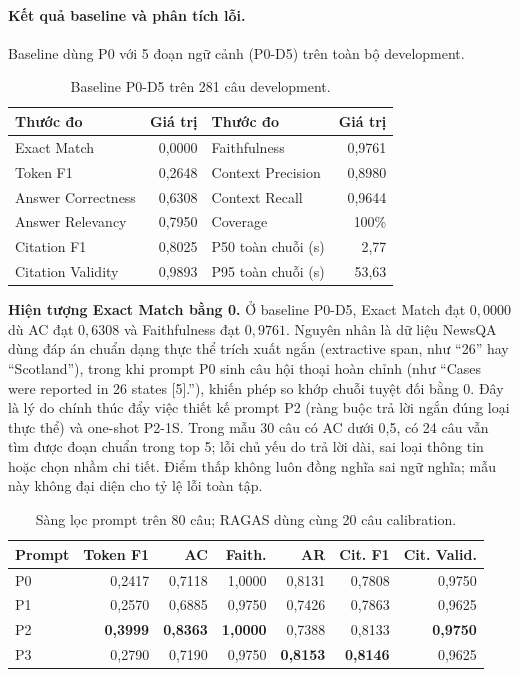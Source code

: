 \paragraph{Kết quả baseline và phân tích lỗi.}
Baseline dùng P0 với 5 đoạn ngữ cảnh (P0-D5) trên toàn bộ development.
\begin{table}[H]\centering\small
\caption{Baseline P0-D5 trên 281 câu development.}\label{tab:phase2-baseline}
\begin{tabularx}{\linewidth}{@{}YrYr@{}}\toprule
\textbf{Thước đo} & \textbf{Giá trị} & \textbf{Thước đo} & \textbf{Giá trị}\\\midrule
Exact Match & 0,0000 & Faithfulness & 0,9761 \\
Token F1 & 0,2648 & Context Precision & 0,8980 \\
Answer Correctness & 0,6308 & Context Recall & 0,9644 \\
Answer Relevancy & 0,7950 & Coverage & 100\% \\
Citation F1 & 0,8025 & P50 toàn chuỗi (s) & 2,77 \\
Citation Validity & 0,9893 & P95 toàn chuỗi (s) & 53,63 \\\bottomrule
\end{tabularx}\end{table}
\textbf{Hiện tượng Exact Match bằng 0.} Ở baseline P0-D5, Exact Match đạt $0{,}0000$ dù AC đạt $0{,}6308$ và Faithfulness đạt $0{,}9761$. Nguyên nhân là dữ liệu NewsQA dùng đáp án chuẩn dạng thực thể trích xuất ngắn (extractive span, như ``26'' hay ``Scotland''), trong khi prompt P0 sinh câu hội thoại hoàn chỉnh (như ``Cases were reported in 26 states [5].''), khiến phép so khớp chuỗi tuyệt đối bằng 0. Đây là lý do chính thúc đẩy việc thiết kế prompt P2 (ràng buộc trả lời ngắn đúng loại thực thể) và one-shot P2-1S. Trong mẫu 30 câu có AC dưới 0,5, có 24 câu vẫn tìm được đoạn chuẩn trong top 5; lỗi chủ yếu do trả lời dài, sai loại thông tin hoặc chọn nhầm chi tiết. Điểm thấp không luôn đồng nghĩa sai ngữ nghĩa; mẫu này không đại diện cho tỷ lệ lỗi toàn tập.
\begin{table}[H]
  \centering
  \caption{Sàng lọc prompt trên 80 câu; RAGAS dùng cùng 20 câu calibration.}
  \label{tab:phase2-prompt-screening}
  \small
  \begin{tabular}{lrrrrrr}
    \toprule
    \textbf{Prompt} & \textbf{Token F1} & \textbf{AC} & \textbf{Faith.} &
    \textbf{AR} & \textbf{Cit. F1} & \textbf{Cit. Valid.} \\
    \midrule
    P0 & 0,2417 & 0,7118 & 1,0000 & 0,8131 & 0,7808 & 0,9750 \\
    P1 & 0,2570 & 0,6885 & 0,9750 & 0,7426 & 0,7863 & 0,9625 \\
    P2 & \textbf{0,3999} & \textbf{0,8363} & \textbf{1,0000} & 0,7388 & 0,8133 & \textbf{0,9750} \\
    P3 & 0,2790 & 0,7190 & 0,9750 & \textbf{0,8153} & \textbf{0,8146} & 0,9625 \\
    \bottomrule
  \end{tabular}
\end{table}

